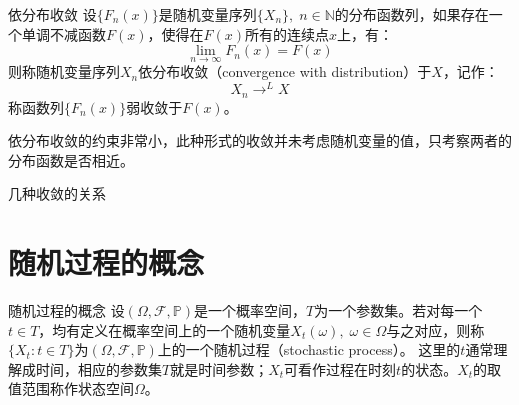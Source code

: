 \documentclass[t]{beamer}
\renewcommand{\Pr}{\mathbb{P}}
\begin{document}
  \begin{frame}{依分布收敛}
    设$\{F_n(x)\}$是随机变量序列$\{X_n\},\;
    n\in\mathbb{N}$的分布函数列，如果存在一个单调不减函数$F(x)$，使得在$F(x)$所有的连续点$x$上，有：
    \[\lim_{n\to\infty}F_n(x)=F(x) \]
    则称随机变量序列$X_n$依分布收敛（convergence with distribution）于$X$，记作：
    \[X_n\mathop{\longrightarrow}^L X \]
    称函数列$\{F_n(x)\}$弱收敛于$F(x)$。
  
    \begin{block}{}
      依分布收敛的约束非常小，此种形式的收敛并未考虑随机变量的值，只考察两者的分布函数是否相近。
    \end{block}
  \end{frame}


  \begin{frame}{几种收敛的关系}
    \centering
  
  \end{frame}
  

  \section{随机过程的概念}
  \begin{frame}{随机过程的概念}
    设$(\Omega,\mathcal{F},\Pr)$是一个概率空间，$T$为一个参数集。若对每一个$t\in
    T$，均有定义在概率空间上的一个随机变量$X_t(\omega),\;
    \omega\in\Omega$与之对应，则称$\{X_t:t\in
    T\}$为$(\Omega,\mathcal{F},\Pr)$上的一个随机过程（stochastic process）。
    这里的$t$通常理解成时间，相应的参数集$T$就是时间参数；$X_t$可看作过程在时刻$t$的状态。$X_t$的取值范围称作状态空间$\Omega$。
    
  
  \end{frame}
\end{document}
